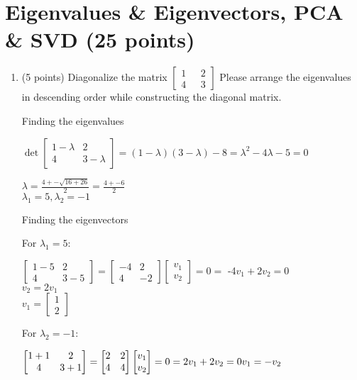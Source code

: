 \documentclass{article}%
\begin{document}
\section*{Eigenvalues \& Eigenvectors, PCA \& SVD (25 points)}
\begin{enumerate}
    \setcounter{enumi}{0}
    \item (5 points) Diagonalize the matrix 
    $\begin{bmatrix}
        1 \ \ \ & 2\\
        4 \ \ \ & 3
    \end{bmatrix}$
    Please arrange the eigenvalues in descending order while constructing the diagonal matrix.

    Finding the eigenvalues
    
    $\det{\begin{bmatrix}
        1 - \lambda & 2\\
        4 & 3 - \lambda
        \end{bmatrix}} = (1 - \lambda)(3 - \lambda) - 8 = \lambda^2 - 4\lambda - 5 = 0$
    
    $\lambda = \frac{4 +- \sqrt{16 + 26}}{2} = \frac{4 +- 6}{2}$ \\
    $\lambda_1 = 5, \lambda_2 = -1$

    Finding the eigenvectors

    For $\lambda_1 = 5$:

    $\begin{bmatrix}
        1 - 5 & 2\\
        4 & 3 - 5
    \end{bmatrix} = \begin{bmatrix}
        -4 & 2\\
        4 & -2 \end{bmatrix} \begin{bmatrix}
            v_1\\
            v_2 \end{bmatrix} = 0 =$
        -4$v_1 + 2v_2 = 0$\\
        $v_2 = 2v_1$\\
    $v_1 = \begin{bmatrix}
        1\\
        2
    \end{bmatrix}$

    For $\lambda_2 = -1$:

    $\begin{bmatrix}
        1 + 1 & 2\\
        4 & 3 + 1 \end{bmatrix} = 
    \begin{bmatrix}
        2 & 2\\
        4 & 4 \end{bmatrix} \begin{bmatrix}
            v_1\\
            v_2 \end{bmatrix} = 0 = 2v_1 + 2v_2 = 0\\
        v_1 = -v_2$


\end{enumerate}
\end{document}
